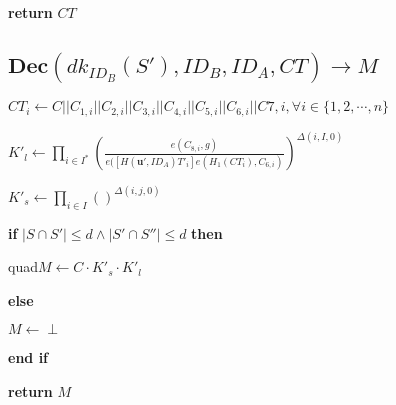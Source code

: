 \documentclass[a4paper]{article}
\begin{document}
\textbf{return} $\textit{CT}$

\subsection{$\textbf{Dec}(\textit{dk}_{\textit{ID}_B}(S'), \textit{ID}_B, \textit{ID}_A, \textit{CT}) \rightarrow M$}

$\textit{CT}_i \gets C || C_{1, i} || C_{2, i} || C_{3, i} || C_{4, i} || C_{5, i} || C_{6, i} || C{7, i}, \forall i \in \{1, 2, \cdots, n\}$

$K'_l \gets \prod\limits_{i \in I^*} \left(\frac{e(C_{8, i}, g)}{e([H(\bm{u}', \textit{ID}_A) T'_i] e(H_1(\textit{CT}_i), C_{6, i})}\right)^{\Delta(i, I, 0)}$

$K'_s \gets \prod\limits_{i \in I} \left(\right)^{\Delta(i, j, 0)}$

\textbf{if} $|S \cap S'| \leqslant d \land |S' \cap S''| \leqslant d$ \textbf{then}

quad$M \gets C \cdot K'_s \cdot K'_l$

\textbf{else}

	\quad$M \gets \perp$

\textbf{end if}

\textbf{return} $M$
\end{document}
